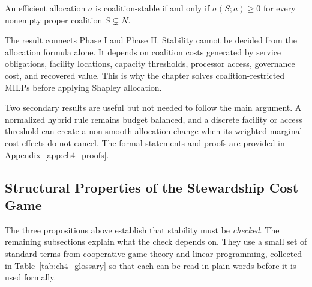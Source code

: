 \begin{proposition}
\label{prop:ch4_core_depends_phase1}
An efficient allocation $a$ is coalition-stable if and only if $\sigma(S;a)\geq 0$ for every nonempty proper coalition $S\subsetneq N$.
\end{proposition}

The result connects Phase I and Phase II. Stability cannot be decided from the allocation formula alone. It depends on coalition costs generated by service obligations, facility locations, capacity thresholds, processor access, governance cost, and recovered value. This is why the chapter solves coalition-restricted MILPs before applying Shapley allocation.

Two secondary results are useful but not needed to follow the main argument. A normalized hybrid rule remains budget balanced, and a discrete facility or access threshold can create a non-smooth allocation change when its weighted marginal-cost effects do not cancel. The formal statements and proofs are provided in Appendix~\ref{app:ch4_proofs}.

\subsection{Structural Properties of the Stewardship Cost Game}
\label{sec:ch4_structural_theory}

The three propositions above establish that stability must be \emph{checked}. The remaining subsections explain what the check depends on. They use a small set of standard terms from cooperative game theory and linear programming, collected in Table~\ref{tab:ch4_glossary} so that each can be read in plain words before it is used formally.


